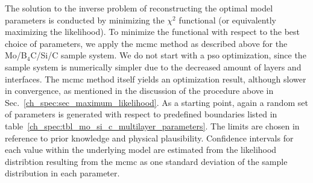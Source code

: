 % 

The solution to the inverse problem of reconstructing the optimal model parameters is conducted by minimizing  the $\chi^2$ functional (or equivalently maximizing the likelihood). To minimize the functional with respect to the best choice of parameters, we apply the \gls{mcmc} method as described above for the Mo/B$_4$C/Si/C sample system. We do not start with a \gls{pso} optimization, since the sample system is numerically simpler due to the decreased amount of layers and interfaces. The \gls{mcmc} method itself yields an optimization result, although slower in convergence, as mentioned in the discussion of the procedure above in Sec.~\ref{ch_spec:sec_maximum_likelihood}. As a starting point, again a random set of parameters is generated with respect to predefined boundaries listed in table~\ref{ch_spec:tbl_mo_si_c_multilayer_parameters}. The limits are chosen in reference to prior knowledge and physical plausibility. Confidence intervals for each value within the underlying model are estimated from the likelihood distribtion resulting from the \gls{mcmc} as one standard deviation of the sample distribution in each parameter.

